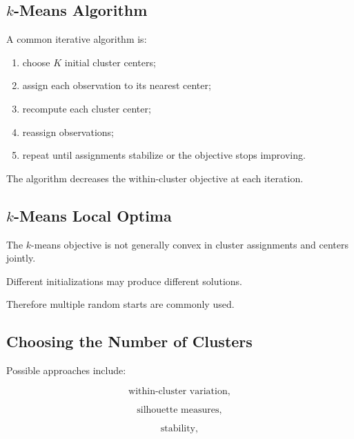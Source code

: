 \subsection{\(k\)-Means Algorithm}
\label{subsec:kmeans-algorithm}

A common iterative algorithm is:

\begin{enumerate}
    \item choose \(K\) initial cluster centers;
    \item assign each observation to its nearest center;
    \item recompute each cluster center;
    \item reassign observations;
    \item repeat until assignments stabilize or the objective stops
          improving.
\end{enumerate}

The algorithm decreases the within-cluster objective at each iteration.

\subsection{\(k\)-Means Local Optima}
\label{subsec:kmeans-local-optima}

The \(k\)-means objective is not generally convex in cluster assignments
and centers jointly.

Different initializations may produce different solutions.

Therefore multiple random starts are commonly used.

\subsection{Choosing the Number of Clusters}
\label{subsec:choosing-number-clusters}

Possible approaches include:

\[
\boxed{
\text{within-cluster variation},
}
\]

\[
\boxed{
\text{silhouette measures},
}
\]

\[
\boxed{
\text{stability},
}
\]

